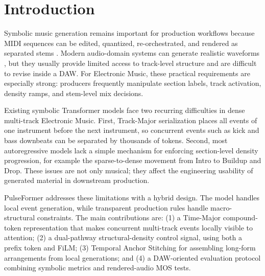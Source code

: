 \documentclass[conference]{conference-latex-template_10-17-19/IEEEtran}
\begin{document}
\section{Introduction}
Symbolic music generation remains important for production workflows because MIDI sequences can be edited, quantized, re-orchestrated, and rendered as separated stems \cite{huang2019music,dong2020muspy}. Modern audio-domain systems can generate realistic waveforms \cite{copet2023simple,agostinelli2023musiclm}, but they usually provide limited access to track-level structure and are difficult to revise inside a DAW. For Electronic Music, these practical requirements are especially strong: producers frequently manipulate section labels, track activation, density ramps, and stem-level mix decisions.

Existing symbolic Transformer models \cite{vaswani2017attention,hsiao2021compound,ens2020mmm} face two recurring difficulties in dense multi-track Electronic Music. First, Track-Major serialization places all events of one instrument before the next instrument, so concurrent events such as kick and bass downbeats can be separated by thousands of tokens. Second, most autoregressive models lack a simple mechanism for enforcing section-level density progression, for example the sparse-to-dense movement from Intro to Buildup and Drop. These issues are not only musical; they affect the engineering usability of generated material in downstream production.

PulseFormer addresses these limitations with a hybrid design. The model handles local event generation, while transparent production rules handle macro-structural constraints. The main contributions are: (1) a Time-Major compound-token representation that makes concurrent multi-track events locally visible to attention; (2) a dual-pathway structural-density control signal, using both a prefix token and FiLM; (3) Temporal Anchor Stitching for assembling long-form arrangements from local generations; and (4) a DAW-oriented evaluation protocol combining symbolic metrics and rendered-audio MOS tests.
\end{document}
